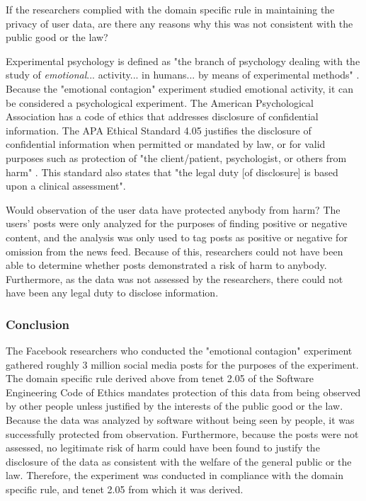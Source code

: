 If the researchers complied with the domain specific rule in maintaining the privacy of user data, are there any reasons why this was not consistent with the public good or the law? \par 
Experimental psychology is defined as "the branch of psychology dealing with the study of \textit{emotional}... activity... in humans... by means of experimental methods" \cite{define-experimental-psychology}.  Because the "emotional contagion" experiment studied emotional activity, it can be considered a psychological experiment.  The American Psychological Association has a code of ethics that addresses disclosure of confidential information.  The APA Ethical Standard 4.05 justifies the disclosure of confidential information when permitted or mandated by law, or for valid purposes such as protection of "the client/patient, psychologist, or others from harm" \cite{disclose-information}.  This standard also states that "the legal duty [of disclosure] is based upon a clinical assessment". \par
Would observation of the user data have protected anybody from harm? 
The users' posts were only analyzed for the purposes of finding positive or negative content, and the analysis was only used to tag posts as positive or negative for omission from the news feed.  Because of this, researchers could not have been able to determine whether posts demonstrated a risk of harm to anybody.  Furthermore, as the data was not assessed by the researchers, there could not have been any legal duty to disclose information.

\subsubsection{Conclusion}
The Facebook researchers who conducted the "emotional contagion" experiment gathered roughly 3 million social media posts for the purposes of the experiment.  The domain specific rule derived above from tenet 2.05 of the Software Engineering Code of Ethics mandates protection of this data from being observed by other people unless justified by the interests of the public good or the law.  Because the data was analyzed by software without being seen by people, it was successfully protected from observation.  Furthermore, because the posts were not assessed, no legitimate risk of harm could have been found to justify the disclosure of the data as consistent with the welfare of the general public or the law.  Therefore, the experiment was conducted in compliance with the domain specific rule, and tenet 2.05 from which it was derived.
\vspace{0.4cm}